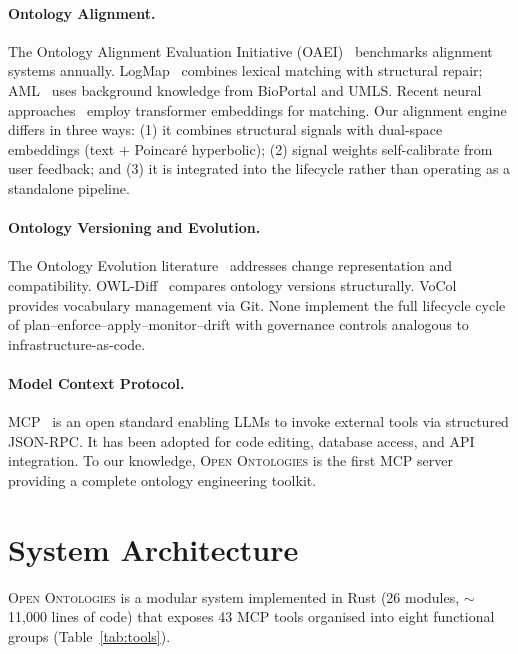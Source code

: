 \documentclass[runningheads]{llncs}
\begin{document}
\paragraph{Ontology Alignment.}
The Ontology Alignment Evaluation Initiative (OAEI)~\cite{oaei} benchmarks alignment systems annually. LogMap~\cite{logmap} combines lexical matching with structural repair; AML~\cite{aml} uses background knowledge from BioPortal and UMLS. Recent neural approaches~\cite{bertmap,olala} employ transformer embeddings for matching. Our alignment engine differs in three ways: (1) it combines structural signals with dual-space embeddings (text + Poincar\'e hyperbolic); (2) signal weights self-calibrate from user feedback; and (3) it is integrated into the lifecycle rather than operating as a standalone pipeline.

\paragraph{Ontology Versioning and Evolution.}
The Ontology Evolution literature~\cite{onto_evolution} addresses change representation and compatibility. OWL-Diff~\cite{owldiff} compares ontology versions structurally. VoCol~\cite{vocol} provides vocabulary management via Git. None implement the full lifecycle cycle of plan--enforce--apply--monitor--drift with governance controls analogous to infrastructure-as-code.

\paragraph{Model Context Protocol.}
MCP~\cite{mcp} is an open standard enabling LLMs to invoke external tools via structured JSON-RPC. It has been adopted for code editing, database access, and API integration. To our knowledge, \textsc{Open Ontologies} is the first MCP server providing a complete ontology engineering toolkit.


\section{System Architecture}
\label{sec:architecture}

\textsc{Open Ontologies} is a modular system implemented in Rust (26 modules, $\sim$11{,}000 lines of code) that exposes 43 MCP tools organised into eight functional groups (Table~\ref{tab:tools}).
\end{document}
